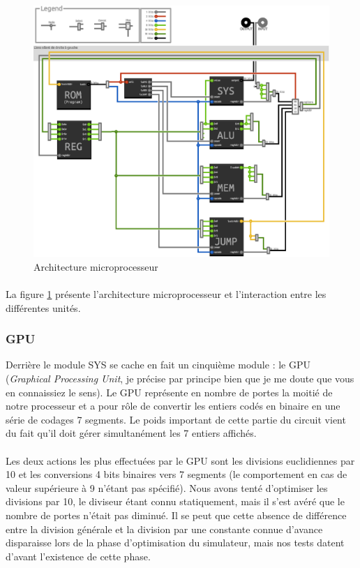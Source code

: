 \documentclass{article}
\begin{document}
\begin{figure}[h]
\centering
\includegraphics{archi.eps}
\caption{\label{archi} Architecture microprocesseur}
\end{figure}
\paragraph{}La figure \ref{archi} présente l'architecture microprocesseur et l'interaction
entre les différentes unités.


\subsubsection{GPU}
Derrière le module SYS se cache en fait un cinquième module : le GPU (\emph{Graphical Processing Unit}, je précise par principe bien que je me doute que vous en connaissiez le sens). Le GPU représente en nombre de portes la moitié de notre processeur et a pour rôle de convertir les entiers codés en binaire en une série de codages 7 segments. Le poids important de cette partie du circuit vient du fait qu'il doit gérer simultanément les 7 entiers affichés.

\paragraph{}Les deux actions les plus effectuées par le GPU sont les divisions euclidiennes par 10 et les conversions 4 bits binaires vers 7 segments (le comportement en cas de valeur supérieure à 9 n'étant pas spécifié). Nous avons tenté d'optimiser les divisions par 10, le diviseur étant connu statiquement, mais il s'est avéré que le nombre de portes n'était pas diminué. Il se peut que cette absence de différence entre la division générale et la division par une constante connue d'avance disparaisse lors de la phase d'optimisation du simulateur, mais nos tests datent d'avant l'existence de cette phase.
\end{document}
